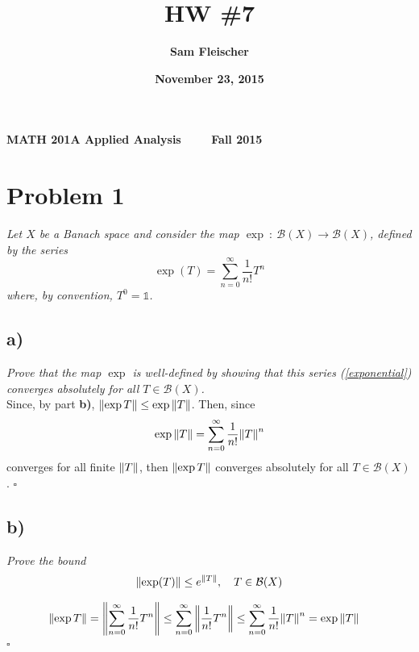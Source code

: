 \documentclass[12pt]{article}
\title{\bf HW \#7}
\author{\bf Sam Fleischer}
\date{\bf November 23, 2015}
\theoremstyle{plain}
\begin{document}
\noindent\textbf{MATH 201A \hfill Applied Analysis \ \ \ \ \hfill Fall 2015} 

{\let\newpage\relax\maketitle}

\section*{Problem 1}
\emph{Let $X$ be a Banach space and consider the map $\exp\ :\ \mathcal{B}(X) \rightarrow \mathcal{B}(X)$, defined by the series}
\begin{equation}
    \label{exponential}
    \exp(T) = \sum_{n=0}^\infty \frac{1}{n!}T^n
\end{equation}
\emph{where, by convention, $T^0 = \mathbb{1}$.}

\subsection*{ a)}
\emph{Prove that the map $\exp$ is well-defined by showing that this series (\ref{exponential}) converges absolutely for all $T \in \mathcal{B}(X)$.} \\

Since, by part \textbf{b)}, $\norm{\exp T} \leq \exp \norm{T}$.  Then, since
\begin{align*}
    \exp \norm{T} = \sum_{n=0}^\infty\frac{1}{n!}\norm{T}^n
\end{align*}
converges for all finite $\norm{T}$, then $\norm{\exp T}$ converges absolutely for all $T \in \mathcal{B}(X)$. \hfill $\square$

\subsection*{ b)}
\emph{Prove the bound}
\begin{align*}
    \norm{\exp(T)} \leq e^{\norm{T}},\ \ \ T \in \mathcal{B}(X)
\end{align*}

\begin{align*}
    \norm{\exp T} &= \norm{\sum_{n=0}^\infty \frac{1}{n!}T^n} \leq \sum_{n=0}^\infty\norm{\frac{1}{n!}T^n} \leq \sum_{n=0}^\infty\frac{1}{n!}\norm{T}^n = \exp\norm{T}
\end{align*}
\hfill $\square$
\end{document}
